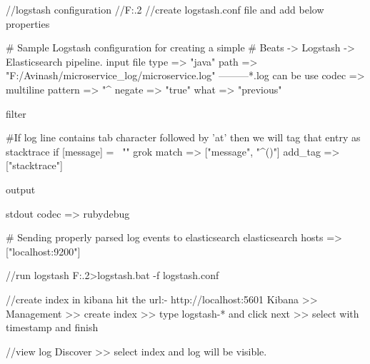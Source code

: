 //logstash configuration
//F:\Avinash\Microservice\ELK{}.2\bin
//create logstash.conf file and add below properties

# Sample Logstash configuration for creating a simple
# Beats -> Logstash -> Elasticsearch pipeline.
input {
  file {
    type => "java"
    path => "F:/Avinash/microservice_log/microservice.log"  ---------*.log can be use
    codec => multiline {
      pattern => "^%
      negate => "true"
      what => "previous"
    }
  }
}

filter {
  #If log line contains tab character followed by 'at' then we will tag that entry as stacktrace
  if [message] =~ "\tat" {
    grok {
      match => ["message", "^(\tat)"]
      add_tag => ["stacktrace"]
    }
  }

}

output {

  stdout {
    codec => rubydebug
  }

  # Sending properly parsed log events to elasticsearch
  elasticsearch {
    hosts => ["localhost:9200"]
  }
}


//run logstash
F:\Avinash\Microservice\ELK{}.2\bin>logstash.bat -f logstash.conf

//create index in kibana hit the url:- http://localhost:5601
Kibana >> Management >> create index >> type logstash-* and click next >> select with timestamp and finish

//view log
Discover >> select index and log will be visible.